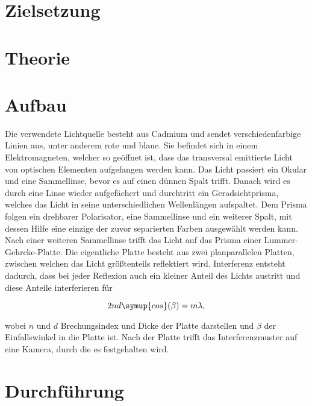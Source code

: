 



    \section{Zielsetzung}

    \section{Theorie}

    \section{Aufbau}

        Die verwendete Lichtquelle besteht aus Cadmium und sendet verschiedenfarbige 
        Linien aus, unter anderem rote und blaue. Sie befindet sich in einem Elektromagneten, 
        welcher so geöffnet ist, dass das transversal emittierte Licht von 
        optischen Elementen aufgefangen werden kann. 
        Das Licht passiert ein Okular und eine Sammellinse, bevor es auf einen dünnen 
        Spalt trifft. Danach wird es durch eine Linse wieder aufgefächert und durchtritt ein 
        Geradsichtprisma, welches das Licht in seine unterschiedlichen Wellenlängen aufspaltet. 
        Dem Prisma folgen ein drehbarer Polarisator, eine Sammellinse und ein weiterer Spalt, 
        mit dessen Hilfe eine einzige der zuvor separierten Farben ausgewählt werden kann. 
        Nach einer weiteren Sammellinse trifft das Licht auf das Prisma einer Lummer-Gehrcke-Platte. 
        Die eigentliche Platte besteht aus zwei planparallelen Platten, zwischen welchen 
        das Licht größtenteils reflektiert wird. Interferenz entsteht dadurch, dass bei jeder 
        Reflexion auch ein kleiner Anteil des Lichts austritt und diese Anteile interferieren für 

        \begin{equation}
            2 n d \symup{cos}(\beta) = m\lambda,
        \end{equation}

        wobei $n$ und $d$ Brechungsindex und Dicke der Platte darstellen und $\beta$ der
        Einfallswinkel in die Platte ist. Nach der Platte trifft das Interferenzmuster auf eine 
        Kamera, durch die es festgehalten wird.

    \section{Durchführung}

